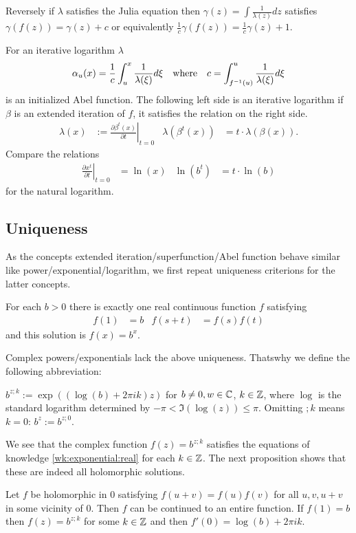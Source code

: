 \documentclass{article}
\numberwithin{equation}{section}
\begin{document}
Reversely if $\lambda$ satisfies the Julia equation then
$\gamma(z)=\int \frac{1}{\lambda(z)} dz$ satisfies
$\gamma(f(z))=\gamma(z)+c$ or equivalently
$\frac{1}{c}\gamma(f(z))=\frac{1}{c}\gamma(z)+1$.

For an iterative logarithm $\lambda$
\begin{align}
  \alpha_u(x)=\frac{1}{c}\int_u^x \frac{1}{ \lambda(\xi)} d\xi  \quad\mbox{where}\quad
  c=\int_{f^{-1}(u)}^{u}
  \frac{1}{\lambda(\xi)} d\xi
\end{align}
is an initialized Abel function. The following left side is an
iterative logarithm if $\beta$ is an extended iteration of $f$, it
satisfies the relation on the right side.
\begin{align}
  \lambda(x) &:= \left.\frac{\partial \beta^t(x)}{\partial t}\right|_{t=0}&
  \lambda(\beta^t(x))&=t\cdot \lambda(\beta(x)).
\end{align}
Compare the relations
\begin{align*}
  \left.\frac{\partial x^t}{\partial t}\right|_{t=0} &= \ln(x) & 
  \ln(b^t)&=t\cdot\ln(b)
\end{align*}
for the natural logarithm.

\subsection{Uniqueness} 

As the concepts extended iteration/superfunction/Abel function behave
similar like power/exponential/logarithm, we first repeat uniqueness
criterions for the latter concepts.

\begin{wellknown}\label{wk:exponential:real}
  For each $b>0$ there is exactly one real continuous function $f$ satisfying
  \begin{align*}
    f(1)&=b & f(s+t)&=f(s)f(t)
  \end{align*}
  and this solution is $f(x)=b^x$.
\end{wellknown}

Complex powers/exponentials lack the above uniqueness. Thatswhy we define the
following abbreviation:
\begin{definition}
  $b^{z;k} := \exp((\log(b)+2\pi i k)z)$ for $b\neq 0,w\in\mathbb{C}$,
  $k\in\mathbb{Z}$, where $\log$ is the standard logarithm determined by
  $-\pi<\Im(\log(z))\le \pi$. Omitting $;k$ means $k=0$:
  $b^z:=b^{z;0}$.
\end{definition}
We see that the complex function $f(z)=b^{z;k}$ satisfies the equations 
of knowledge \ref{wk:exponential:real} for each $k\in\mathbb{Z}$. 
The next proposition shows that these are indeed all holomorphic solutions.
\begin{wellknown}[$b^{w;k}$]\label{wk:exponential:holomorphic}
  Let $f$ be holomorphic in 0 satisfying $f(u+v)=f(u)f(v)$
  for all $u,v,u+v$ in some vicinity of 0. Then $f$ can be continued
  to an entire function. If $f(1)=b$ then $f(z)=b^{z;k}$ for some
  $k\in \mathbb{Z}$ and then $f'(0)=\log(b)+2\pi i k$.
\end{wellknown}
\end{document}
